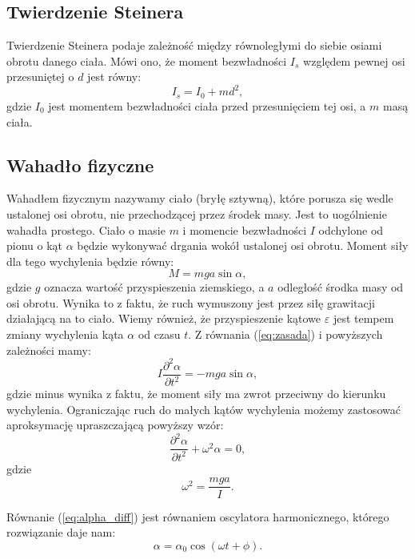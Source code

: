 \documentclass[12pt,a4paper]{article}
\numberwithin{equation}{section}
\begin{document}
\subsection{Twierdzenie Steinera}

Twierdzenie Steinera podaje zależność między równoległymi do siebie osiami obrotu danego ciała. Mówi ono, że moment bezwładności $I_s$ względem pewnej osi przesuniętej o $d$ jest równy:
\begin{equation}
	I_s = I_0 + md^2,
	\label{eq:steiner}
\end{equation}
gdzie $I_0$ jest momentem bezwładności ciała przed przesunięciem tej osi, a $m$ masą ciała.

\subsection{Wahadło fizyczne}

Wahadłem fizycznym nazywamy ciało (bryłę sztywną), które porusza się wedle ustalonej osi obrotu, nie przechodzącej przez środek masy. Jest to uogólnienie wahadła prostego. Ciało o masie $m$ i momencie bezwładności $I$ odchylone od pionu o kąt $\alpha$ będzie wykonywać drgania wokół ustalonej osi obrotu. Moment siły dla tego wychylenia będzie równy:
\begin{equation}
	M = mga \sin\alpha,
\end{equation}
gdzie $g$ oznacza wartość przyspieszenia ziemskiego, a $a$ odległość środka masy od osi obrotu. Wynika to z faktu, że ruch wymuszony jest przez siłę grawitacji działającą na to ciało. Wiemy również, że przyspieszenie kątowe $\varepsilon$ jest tempem zmiany wychylenia kąta $\alpha$ od czasu $t$. Z równania (\ref{eq:zasada}) i powyższych zależności mamy:
\begin{equation}
	I \frac{\partial^2 \alpha}{\partial t^2} = -mga \sin\alpha,
\end{equation}
gdzie minus wynika z faktu, że moment siły ma zwrot przeciwny do kierunku wychylenia.
Ograniczając ruch do małych kątów wychylenia możemy zastosować aproksymację upraszczającą powyższy wzór:
\begin{equation}
	\frac{\partial^2 \alpha}{\partial t^2} + \omega^2 \alpha = 0,
	\label{eq:alpha_diff}
\end{equation}
gdzie
\begin{equation}
	\omega^2 = \frac{mga}{I}.
	\label{eq:czest}
\end{equation}

Równanie (\ref{eq:alpha_diff}) jest równaniem oscylatora harmonicznego, którego rozwiązanie daje nam:
\begin{equation}
	\alpha = \alpha_0 \cos(\omega t + \phi).
\end{equation}
\end{document}
